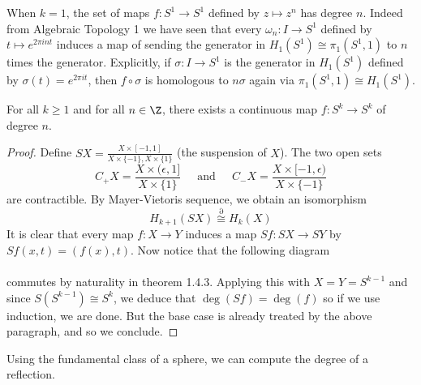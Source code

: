 \documentclass[a4paper]{article}
\begin{document}
When $k=1$, the set of maps $f:S^1\to S^1$ defined by $z\mapsto z^n$ has degree $n$. Indeed from Algebraic Topology 1 we have seen that every $\omega_n:I\to S^1$ defined by $t\mapsto e^{2\pi int}$ induces a map of sending the generator in $H_1(S^1)\cong\pi_1(S^1,1)$ to $n$ times the generator. Explicitly, if $\sigma:I\to S^1$ is the generator in $H_1(S^1)$ defined by $\sigma(t)=e^{2\pi it}$, then $f\circ\sigma$ is homologous to $n\sigma$ again via $\pi_1(S^1,1)\cong H_1(S^1)$. 

\begin{prp}{}{} For all $k\geq 1$ and for all $n\in\Z$, there exists a continuous map $f:S^k\to S^k$ of degree $n$. 
\begin{proof}
Define $SX=\frac{X\times[-1,1]}{X\times\{-1\},X\times\{1\}}$ (the suspension of $X$). The two open sets $$C_+X=\frac{X\times(\epsilon,1]}{X\times\{1\}}\;\;\;\;\text{ and }\;\;\;\; C_-X=\frac{X\times[-1,\epsilon)}{X\times\{-1\}}$$ are contractible. By Mayer-Vietoris sequence, we obtain an isomorphism $$H_{k+1}(SX)\overset{\partial}{\cong}H_k(X)$$ It is clear that every map $f:X\to Y$ induces a map $Sf:SX\to SY$ by $Sf(x,t)=(f(x),t)$. Now notice that the following diagram \\
\\
commutes by naturality in theorem 1.4.3. Applying this with $X=Y=S^{k-1}$ and since $S(S^{k-1})\cong S^k$, we deduce that $\deg(Sf)=\deg(f)$ so if we use induction, we are done. But the base case is already treated by the above paragraph, and so we conclude. 
\end{proof}
\end{prp}

Using the fundamental class of a sphere, we can compute the degree of a reflection. 
\end{document}
